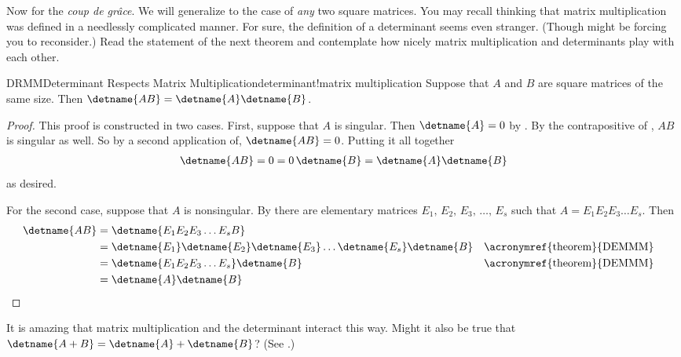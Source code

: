 %
Now for the {\it coup de gr\^{a}ce}.  We will generalize  to the case of {\em any} two square matrices.   You may recall thinking that matrix multiplication was defined in a needlessly complicated manner.  For sure, the definition of a determinant seems even stranger.  (Though  might be forcing you to reconsider.)  Read the statement of the next theorem and contemplate how nicely matrix multiplication and determinants play with each other.
%
\begin{theorem}{DRMM}{Determinant Respects Matrix Multiplication}{determinant!matrix multiplication}
Suppose that $A$ and $B$ are square matrices of the same size.  Then $\detname{AB}=\detname{A}\detname{B}$.
\end{theorem}
%
%
\begin{proof}
This proof is constructed in two cases.  First, suppose that $A$ is singular.  Then $\detname{A}=0$ by .  By the contrapositive of , $AB$ is singular as well.
So by a second application of, $\detname{AB}=0$.  Putting it all together
%
\begin{align*}
\detname{AB}=0=0\,\detname{B}=\detname{A}\detname{B}
\end{align*}
%
as desired.\par
%
For the second case, suppose that $A$ is nonsingular.  By  there are elementary matrices $E_{1},\,E_{2},\,E_{3},\,\dots,\,E_{s}$ such that $A=E_1E_2E_3\dots E_s$.
Then
%
\begin{align*}
\detname{AB}
&=
\detname{E_1E_2E_3\dots E_{s}B}\\
%
&=
\detname{E_1}\detname{E_2}\detname{E_3}\dots\detname{E_s}\detname{B}
&&\text{\acronymref{theorem}{DEMMM}}\\
%
&=
\detname{E_1E_2E_3\dots E_s}\detname{B}
&&\text{\acronymref{theorem}{DEMMM}}\\
%
&=
\detname{A}\detname{B}
%
\end{align*}
%
\end{proof}
%
It is amazing that matrix multiplication and the determinant interact this way.  Might it also be true that $\detname{A+B}=\detname{A}+\detname{B}$?  (See .)
%
%
%
